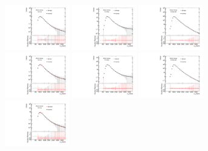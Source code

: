 \begin{figure}[htbp!]
\begin{center}
\includegraphics[width=0.25\textwidth,angle=-90]{figures/boosted/Syst_CRSB/SB_High_compare_FourTag_qcd_hh.pdf}
\includegraphics[width=0.25\textwidth,angle=-90]{figures/boosted/Syst_CRSB/SB_High_compare_ThreeTag_qcd_hh.pdf}
\includegraphics[width=0.25\textwidth,angle=-90]{figures/boosted/Syst_CRSB/SB_High_compare_TwoTag_split_qcd_hh.pdf}
\includegraphics[width=0.25\textwidth,angle=-90]{figures/boosted/Syst_CRSB/SB_Low_compare_FourTag_qcd_hh.pdf}
\includegraphics[width=0.25\textwidth,angle=-90]{figures/boosted/Syst_CRSB/SB_Low_compare_ThreeTag_qcd_hh.pdf}
\includegraphics[width=0.25\textwidth,angle=-90]{figures/boosted/Syst_CRSB/SB_Low_compare_TwoTag_split_qcd_hh.pdf}
\includegraphics[width=0.25\textwidth,angle=-90]{figures/boosted/Syst_CRSB/SB_Small_compare_FourTag_qcd_hh.pdf}

\end{center}
\end{figure}
